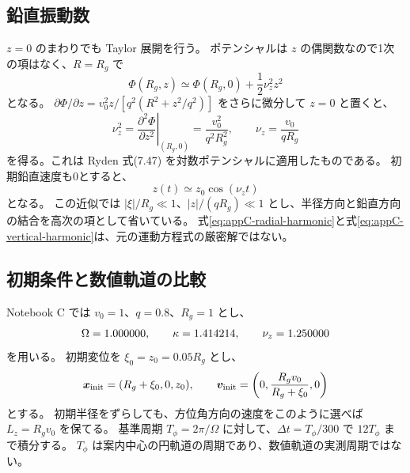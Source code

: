\subsection{鉛直振動数}

$z=0$ のまわりでも Taylor 展開を行う。
ポテンシャルは $z$ の偶関数なので1次の項はなく、$R=R_g$ で
\begin{equation}
 \Phi(R_g,z)\simeq\Phi(R_g,0)+\frac12\nu_z^2z^2
\end{equation}
となる。
$\partial\Phi/\partial z=v_0^2z/[q^2(R^2+z^2/q^2)]$ をさらに微分して $z=0$ と置くと、
\begin{equation}
 \nu_z^2=\left.\frac{\partial^2\Phi}{\partial z^2}\right|_{(R_g,0)}
 =\frac{v_0^2}{q^2R_g^2},\qquad
 \boxed{\nu_z=\frac{v_0}{qR_g}}
\label{eq:appC-nuz}
\end{equation}
を得る。これは Ryden 式(7.47) を対数ポテンシャルに適用したものである\cite{ryden2025}。
初期鉛直速度も0とすると、
\begin{equation}
 z(t)\simeq z_0\cos(\nu_z t)
\label{eq:appC-vertical-harmonic}
\end{equation}
となる。
この近似では $|\xi|/R_g\ll1$、$|z|/(qR_g)\ll1$ とし、半径方向と鉛直方向の結合を高次の項として省いている。
式\eqref{eq:appC-radial-harmonic}と式\eqref{eq:appC-vertical-harmonic}は、元の運動方程式の厳密解ではない。

\subsection{初期条件と数値軌道の比較}

Notebook C では $v_0=1$、$q=0.8$、$R_g=1$ とし、
\begin{equation}
 \Omega=1.000000,\qquad
 \kappa=1.414214,\qquad
 \nu_z=1.250000
\end{equation}
を用いる。
初期変位を $\xi_0=z_0=0.05R_g$ とし、
\begin{equation}
 \boldsymbol x_{\rm init}=(R_g+\xi_0,0,z_0),\qquad
 \boldsymbol v_{\rm init}=\left(0,\frac{R_gv_0}{R_g+\xi_0},0\right)
\label{eq:appC-axisym-initial}
\end{equation}
とする。
初期半径をずらしても、方位角方向の速度をこのように選べば $L_z=R_gv_0$ を保てる。
基準周期 $T_\phi=2\pi/\Omega$ に対して、$\Delta t=T_\phi/300$ で $12T_\phi$ まで積分する。
$T_\phi$ は案内中心の円軌道の周期であり、数値軌道の実測周期ではない。

